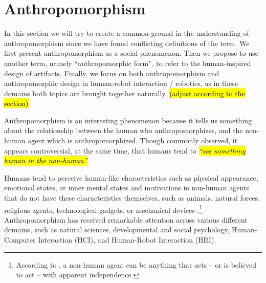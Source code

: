 \documentclass{frontiersSCNS} %
\begin{document}
\section{Anthropomorphism}
\label{sec:anthropomorphism}

In this section we will try to create a common ground in the understanding of anthropomorphism since we have found conflicting definitions of the term. We first present anthropomorphism as a social phenomenon. Then we propose to use another term, namely ``anthropomorphic form'', to refer to the human-inspired design of artifacts. Finally, we focus on both anthropomorphism and anthropomorphic design in human-robot interaction / robotics, as in these domains both topics are brought together naturally. \hl{(adjust according to the section)}


Anthropomorphism is an interesting phenomenon because it tells us something about the relationship between the human who anthropomorphizes, and the non-human agent which is anthropomorphized. Though commonly observed, it appears controversial, at the same time, that humans tend to \hl{\textit{``see something human in the non-human''}}. 


Humans tend to perceive human-like characteristics such as physical appearance, emotional states, or inner mental states and motivations in non-human agents that do not have these characteristics themselves, such as animals, natural forces, religious agents, technological gadgets, or mechanical devices \citep{epley_when_2008}.\footnote{According to \cite{epley_when_2008}, a non-human agent can be anything that acts -- or is believed to act -- with apparent independence.}  Anthropomorphism has received remarkable attention across various different domains, such as natural sciences, developmental and social psychology, Human-Computer Interaction (HCI), and Human-Robot Interaction (HRI).
\end{document}
